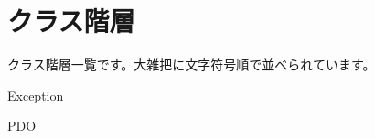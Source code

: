 \section{クラス階層}
クラス階層一覧です。大雑把に文字符号順で並べられています。\begin{DoxyCompactList}
\item Exception\begin{DoxyCompactList}
\item {}
\end{DoxyCompactList}
\item {}
\item P\+D\+O\begin{DoxyCompactList}
\item {}
\end{DoxyCompactList}
\end{DoxyCompactList}
